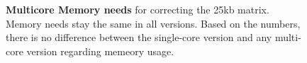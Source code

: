 
\begin{figure}[!htbp]
    \begin{centering}
        \caption[Multicore Memory comparison]
        {\textbf{Multicore Memory needs} for correcting the 25kb matrix. Memory
        needs stay the same in all versions. Based on the numbers, there is no
        difference between the single-core version and any multi-core version
        regarding memeory usage.}
        \label{fig:memmulti}
    \end{centering}
\end{figure}

